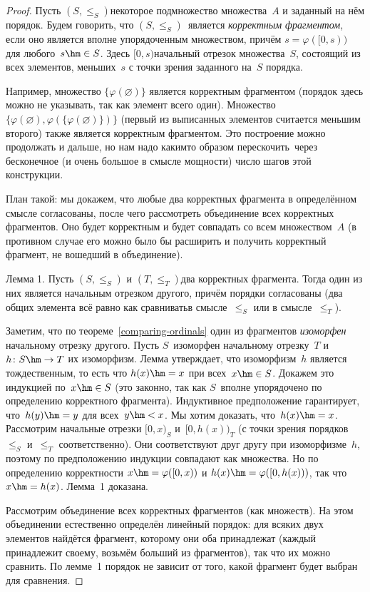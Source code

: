 \begin{proof}
Пусть $(S,\le_S)$\т некоторое подмножество множества~$A$
и заданный на нём порядок. Будем говорить, что
$(S,\le_S)$~является \emph{корректным фрагментом}, если оно является
вполне упорядоченным множеством, причём
        $
s = \varphi ([0,s))
        $
для любого~$s\hm\in S$. Здесь $[0,s)$\т начальный отрезок
множества~$S$, состоящий из всех элементов, меньших~$s$
с точки зрения заданного на~$S$ порядка.

Например, множество $\{\varphi(\varnothing)\}$ является
корректным фрагментом (порядок здесь можно не указывать, так как
элемент всего один). Множество $\{\varphi(\varnothing),
\varphi(\{\varphi(\varnothing)\})\}$ (первый из выписанных
элементов считается меньшим второго) также является корректным
фрагментом. Это построение можно продолжать и дальше, но нам
надо каким\д то образом  перескочить\ через бесконечное (и
очень большое в смысле мощности) число шагов этой конструкции.

План такой: мы докажем, что любые два корректных фрагмента
в определённом смысле согласованы, после чего
рассмотреть объединение всех корректных фрагментов. Оно
будет корректным и будет совпадать со всем множеством~$A$
(в противном случае его можно было бы расширить и получить
корректный фрагмент, не вошедший в объединение).

\textsf{Лемма 1.} Пусть $(S,\le_S)$ и $(T,\le_T)$\т два корректных
фрагмента. Тогда один из них является начальным отрезком
другого, причём порядки согласованы (два общих элемента
всё равно как сравнивать\т в смысле~$\le_S$ или в смысле~$\le_T$).

Заметим, что по теореме~\ref{comparing-ordinals} один из
фрагментов \textsl{изоморфен} начальному отрезку другого. Пусть
$S$~изоморфен начальному отрезку~$T$ и $h\colon S\hm\to T$\т
их изоморфизм. Лемма утверждает, что изоморфизм~$h$
является тождественным, то есть что $h(x)\hm=x$ при всех~$x\hm\in
S$. Докажем это индукцией по~$x\hm\in S$ (это законно, так как $S$~вполне
упорядочено по определению корректного фрагмента).
Индуктивное предположение гарантирует, что~$h(y)\hm=y$ для всех~$y\hm<x$.
Мы хотим доказать, что~$h(x)\hm=x$. Рассмотрим начальные
отрезки $[0,x)_{S}$ и~$[0,h(x))_{T}$ (с точки зрения порядков~$\le_S$
и~$\le_T$ соответственно).
Они соответствуют друг другу
при изоморфизме~$h$, поэтому по предположению индукции совпадают
как множества. Но по определению корректности
$x\hm=\varphi([0,x))$
и $h(x)\hm=\varphi([0,h(x)))$, так что~$x\hm=h(x)$. Лемма~1 доказана.

Рассмотрим объединение всех корректных фрагментов (как
множеств). На этом объединении естественно определён линейный
порядок: для всяких двух элементов найдётся фрагмент, которому
они оба принадлежат (каждый принадлежит своему, возьмём больший
из фрагментов), так что их можно сравнить. По лемме~1 порядок не
зависит от того, какой фрагмент будет выбран для сравнения.


\end{proof}

